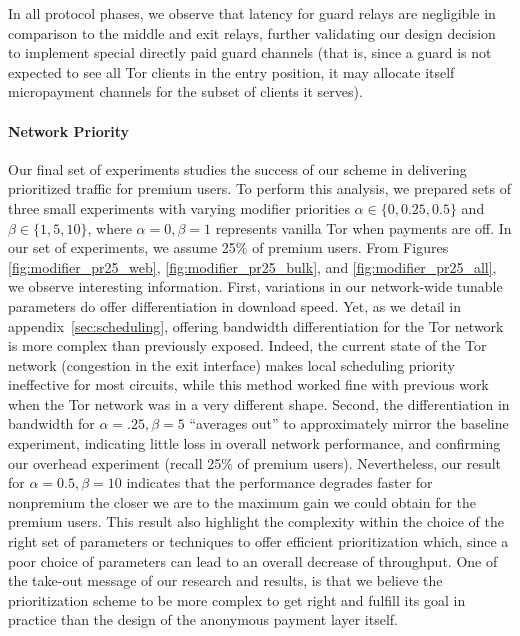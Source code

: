 In all protocol phases, we observe that latency for guard relays are negligible
in comparison to the middle and exit relays, further validating our design
decision to implement special directly paid guard channels (that is, since a
guard is not expected to see all Tor clients in the entry position, it may
allocate itself micropayment channels for the subset of clients it serves).

\paragraph*{Network Priority}
\label{sec:priority_exp}
Our final set of experiments studies the success of our scheme in delivering
prioritized traffic for premium users. To perform this analysis, we prepared
sets of three small experiments with varying modifier priorities $\alpha \in
\{0, 0.25, 0.5\}$ and $\beta \in \{1, 5, 10\}$, where $\alpha = 0, \beta = 1$
represents vanilla Tor when payments are off. In our set of experiments, we
assume 25\% of premium users. From Figures \ref{fig:modifier_pr25_web},
\ref{fig:modifier_pr25_bulk}, and \ref{fig:modifier_pr25_all}, we observe
interesting information. First, variations in our network-wide tunable
parameters do offer differentiation in download speed. Yet, as we detail in
appendix~\ref{sec:scheduling}, offering bandwidth differentiation for the Tor
network is more complex than previously exposed. Indeed, the current state of
the Tor network (congestion in the exit interface) makes local scheduling
priority ineffective for most circuits, while this method worked fine with
previous work when the Tor network was in a very different shape. Second, the
differentiation in bandwidth for $\alpha = .25, \beta=5$ ``averages out'' to
approximately mirror the baseline experiment, indicating little loss in overall
network performance, and confirming our overhead experiment (recall 25\% of
premium users). Nevertheless, our result for $\alpha = 0.5, \beta=10$ indicates
that the performance degrades faster for nonpremium the closer we are to the
maximum gain we could obtain for the premium users. This result also highlight
the complexity within the choice of the right set of parameters or techniques to
offer efficient prioritization which, since a poor choice of parameters can lead
to an overall decrease of throughput. One of the take-out message of our
research and results, is that we believe the prioritization scheme to be more
complex to get right and fulfill its goal in practice than the design of the
anonymous payment layer itself.

